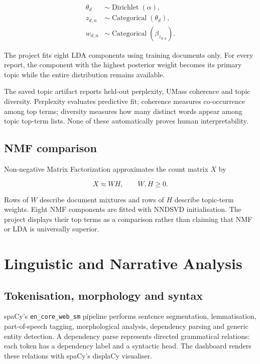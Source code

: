 \documentclass[12pt,a4paper]{report}
\newcommand{\code}[1]{\texttt{#1}}
\begin{document}
\begin{align}
\theta_d &\sim \operatorname{Dirichlet}(\alpha),\\
z_{d,n} &\sim \operatorname{Categorical}(\theta_d),\\
w_{d,n} &\sim \operatorname{Categorical}(\beta_{z_{d,n}}).
\end{align}

The project fits eight LDA components using training documents only. For every report, the component with the highest posterior weight becomes its primary topic while the entire distribution remains available.

The saved topic artifact reports held-out perplexity, UMass coherence and topic diversity. Perplexity evaluates predictive fit; coherence measures co-occurrence among top terms; diversity measures how many distinct words appear among topic top-term lists. None of these automatically proves human interpretability.

\section{NMF comparison}

Non-negative Matrix Factorization approximates the count matrix $X$ by

\begin{equation}
X\approx WH,\qquad W,H\geq0.
\end{equation}

Rows of $W$ describe document mixtures and rows of $H$ describe topic-term weights. Eight NMF components are fitted with NNDSVD initialisation. The project displays their top terms as a comparison rather than claiming that NMF or LDA is universally superior.

\chapter{Linguistic and Narrative Analysis}

\section{Tokenisation, morphology and syntax}

spaCy's \code{en\_core\_web\_sm} pipeline performs sentence segmentation, lemmatisation, part-of-speech tagging, morphological analysis, dependency parsing and generic entity detection. A dependency parse represents directed grammatical relations: each token has a dependency label and a syntactic head. The dashboard renders these relations with spaCy's displaCy visualiser.
\end{document}
